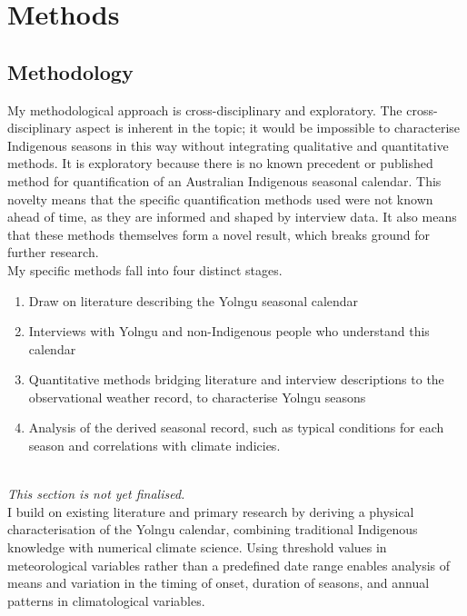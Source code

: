\chapter{Methods}
\label{ch:methods}

\section{Methodology}

My methodological approach is cross-disciplinary and exploratory.
%
The cross-disciplinary aspect is inherent in the topic; it would
be impossible to characterise Indigenous seasons in this way without
integrating qualitative and quantitative methods.
%
It is exploratory because there is no known precedent or published
method for quantification of an Australian Indigenous seasonal calendar.
This novelty means that the specific quantification methods used
were not known ahead of time, as they are informed and shaped by
interview data.  It also means that these methods themselves form
a novel result, which breaks ground for further research.\\

My specific methods fall into four distinct stages.
\begin{enumerate}
\item Draw on literature describing the Yolngu seasonal calendar
\item Interviews with Yolngu and non-Indigenous people who
    understand this calendar
\item Quantitative methods bridging literature and interview
    descriptions to the observational weather record, to characterise
    Yolngu seasons
\item Analysis of the derived seasonal record, such as typical
    conditions for each season and correlations with climate indicies.
\end{enumerate}

~\\

\textit{This section is not yet finalised.}\\


I build on existing literature and primary research by deriving a physical
characterisation of the Yolngu calendar, combining traditional Indigenous
knowledge with numerical climate science. Using threshold values in meteorological
variables rather than a predefined date range enables analysis of means and
variation in the timing of onset, duration of seasons, and annual patterns
in climatological variables.


